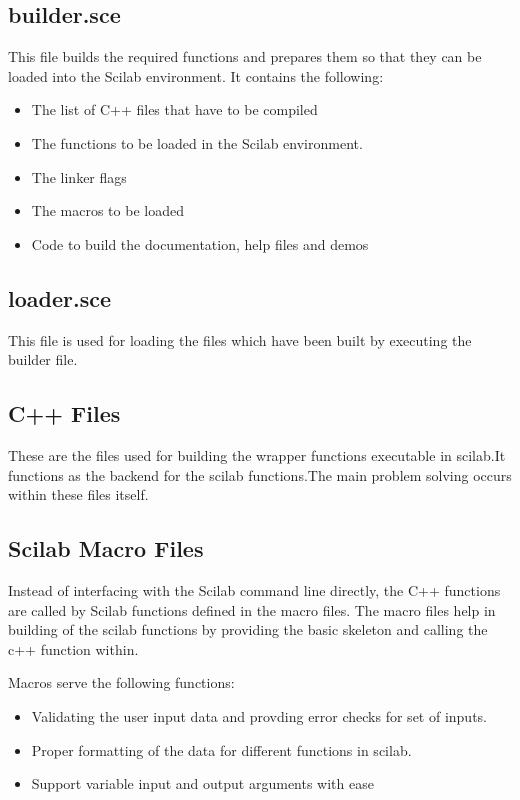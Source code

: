 \documentclass[12pt]{report}
\begin{document}
\subsection{builder.sce}
This file builds the required functions and prepares them so that they can be loaded into the Scilab environment. It contains the following:
\begin{itemize}
	\item The list of C++ files that have to be compiled
	\item The functions to be loaded in the Scilab environment.
	\item The linker flags
	\item The macros to be loaded
	\item Code to build the documentation, help files and demos
\end{itemize}

\subsection{loader.sce}
This file is used for loading the files which have been built by executing the builder file.

\subsection{C++ Files}
These are the files used for building the wrapper functions executable in scilab.It functions 
as the backend for the scilab functions.The main problem solving occurs within these files itself. 

\subsection{Scilab Macro Files}
\justify
Instead of interfacing with the Scilab command line directly, the C++ functions are called by Scilab functions defined in the macro files. The macro files help in building of the scilab 
functions by providing the basic skeleton and calling the c++ function within.

\justify
Macros serve the following functions:
\begin{itemize}
  \item Validating the user input data  and provding error checks for set of inputs.
  \item Proper formatting of the data for different functions in scilab.
  \item Support variable input and output arguments with ease
\end{itemize}
\end{document}
